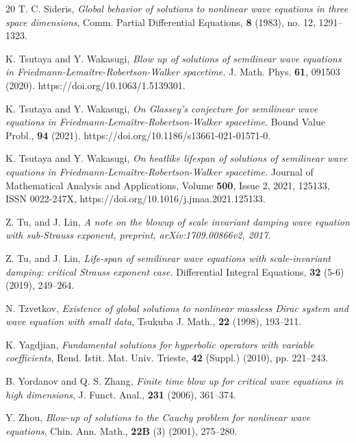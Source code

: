 \documentclass[12pt,leqno]{amsart}
\numberwithin{equation}{section}
\theoremstyle{remark}
\begin{document}
\begin{thebibliography}{20}
{T. C. Sideris}, {\it Global behavior of solutions to nonlinear wave equations in three space dimensions}, Comm. Partial Differential Equations, {\bf 8} (1983), no. 12, 
1291--1323.


 {K. Tsutaya and Y. Wakasugi,} {\it Blow up of solutions of semilinear wave equations in
Friedmann-Lema\^itre-Robertson-Walker spacetime.} J. Math. Phys. {\bf 61}, 091503 (2020).
https://doi.org/10.1063/1.5139301.

 {K. Tsutaya and Y. Wakasugi,} {\it On Glassey's conjecture for semilinear wave equations in Friedmann-Lemaître-Robertson-Walker spacetime.} Bound Value Probl., {\bf 94} (2021). https://doi.org/10.1186/s13661-021-01571-0.

 {K. Tsutaya and Y. Wakasugi,} {\it On heatlike lifespan of solutions of semilinear wave equations in Friedmann-Lema\^itre-Robertson-Walker spacetime.} Journal of Mathematical Analysis and Applications,
Volume {\bf 500}, Issue 2,
2021,
125133,
ISSN 0022-247X,
https://doi.org/10.1016/j.jmaa.2021.125133.

{Z. Tu,  and  J. Lin}, {\it  A note on the blowup of scale invariant damping wave equation with sub-Strauss exponent, preprint, arXiv:1709.00866v2, 2017. }

{Z. Tu,  and  J. Lin}, {\it  
Life-span of semilinear wave equations with scale-invariant damping: critical Strauss exponent case. }
Differential Integral Equations, {\bf 32} (5-6) (2019), 249--264.


{N. Tzvetkov}, {\it Existence of global solutions to nonlinear massless Dirac system and wave equation
with small data}, Tsukuba J. Math., {\bf 22} (1998), 193--211.



{K. Yagdjian}, {\it Fundamental solutions for hyperbolic operators with variable coefficients}, 
Rend. Istit. Mat. Univ. Trieste, {\bf 42} (Suppl.) (2010), pp. 221--243.


{B. Yordanov and Q. S. Zhang}, {\it Finite time blow up for critical wave equations in high dimensions}, J. Funct. Anal., {\bf 231} (2006), 361--374.



{Y. Zhou}, {\it Blow-up of solutions to the Cauchy problem for nonlinear wave equations}, Chin. Ann. Math., {\bf 22B}  (3) (2001), 275--280.





\end{thebibliography}
\end{document}
